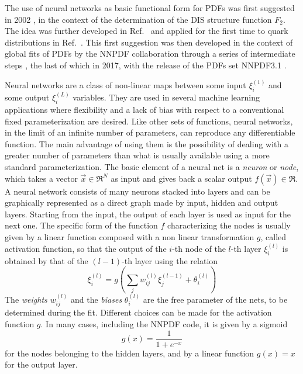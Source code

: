 %
The use of neural networks as basic functional form for PDFs was first suggested in 2002 \cite{Forte:2002fg},
in the context of the determination of the DIS structure function $F_2$. 
The idea was further developed in Ref.~\cite{DelDebbio:2004xtd} and applied for the first time to quark
distributions in Ref.~\cite{DelDebbio:2007ee}. This first suggestion was then developed in the context of 
global fits of PDFs by the NNPDF collaboration through a series of intermediate steps 
\cite{Ball:2008by, Ball:2010de, Ball:2012cx, Ball:2014uwa}, the last of which in 2017, with the
release of the PDFs set NNPDF3.1 \cite{Ball:2017nwa}.

%
Neural networks are a class of non-linear maps between some input $\xi_i^{(1)} $ 
and some output $\xi_i^{(L)} $ variables. They are used in several machine learning applications where flexibility
and a lack of bias with respect to a conventional fixed parameterization  are  desired. 
Like other sets of functions, neural networks, in the limit of an infinite number of parameters, 
can reproduce any differentiable function. The main advantage of using them is the possibility of dealing 
with a greater number of parameters than what is usually available using a more standard parameterization.
The basic element of a neural net is a \textit{neuron} or \textit{node}, which takes a vector $\vec{x} \in \Re^N $ 
as input and gives back a scalar output $ f\left(\vec{x}\right) \in \Re$.
A neural network consists of many neurons stacked into layers and can be graphically represented as a direct graph made by input,
hidden and output layers.
Starting from the input, the output of each layer is used as input for the next one. 
The specific form of the function $f$ characterizing the nodes is usually given by a linear function 
composed with a non linear transformation $g$, called activation function, so that the output of the $i$-th node of 
the $l$-th layer $\xi_i^{(l)}$ is obtained by that of the $(l-1)$-th layer using the relation
\begin{equation}
\label{nodes}
\xi_i^{(l)}= g\left(\sum_jw_{ij}^{(l)}\xi_j^{(l-1)}+\theta_i^{(l)}\right)
\end{equation}
The \textit{weights} $w_{ij}^{(l)} $ and the \textit{biases} $\theta_i^{(l)} $ are the free parameter of the nets, 
to be determined during the fit.
Different choices can be made for the activation function $g$. 
In many cases, including the NNPDF code, it is given by a sigmoid
\begin{equation}
\label{sigmoid}
g\left(x\right)=\frac{1}{1+e^{-x}}
\end{equation}
for the nodes belonging to the hidden layers, and by a linear function $ g(x)=x $ for the output layer.
 
